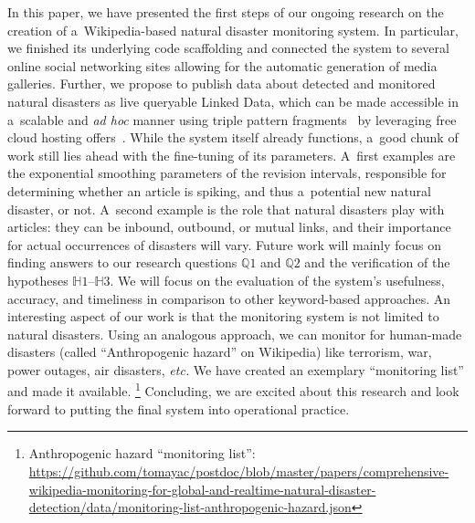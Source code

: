 \documentclass[letterpaper]{article}
\begin{document}
In this paper, we have presented the first steps of our ongoing research
on the creation of a~Wikipedia-based natural disaster monitoring system.
In particular, we finished its underlying code scaffolding
and connected the system to several online social networking sites
allowing for the automatic generation of media galleries.
Further, we propose to publish data about detected
and monitored natural disasters as live queryable Linked Data,
which can be made accessible in a~scalable and \emph{ad hoc} manner
using triple pattern fragments~\cite{verborgh2014ldfiswc}
by leveraging free cloud hosting offers~\cite{DBLP:conf/semweb/MatteisV14}.
While the system itself already functions, a~good chunk of work still lies ahead
with the fine-tuning of its parameters.
A~first examples are the exponential smoothing parameters
of the revision intervals, responsible for determining whether an article
is spiking, and thus a~potential new natural disaster, or not.
A~second example is the role that natural disasters play with articles:
they can be inbound, outbound, or mutual links,
and their importance for actual occurrences of disasters will vary.
Future work will mainly focus on finding answers to our research questions
$\mathbb{Q}1$ and $\mathbb{Q}2$ and the verification of the hypotheses
$\mathbb{H}1$--$\mathbb{H}3$.
We will focus on the evaluation of the system's usefulness, accuracy,
and timeliness in comparison to other keyword-based approaches.
An interesting aspect of our work is that the monitoring system
is not limited to natural disasters.
Using an analogous approach, we can monitor for human-made disasters
(called ``Anthropogenic hazard'' on Wikipedia)
like terrorism, war, power outages, air disasters, \emph{etc.}
We have created an exemplary ``monitoring list'' and made it available.%
\footnote{Anthropogenic hazard ``monitoring list'':
\url{https://github.com/tomayac/postdoc/blob/master/papers/comprehensive-wikipedia-monitoring-for-global-and-realtime-natural-disaster-detection/data/monitoring-list-anthropogenic-hazard.json}}
Concluding, we are excited about this research
and look forward to putting the final system into operational practice.



\end{document}
